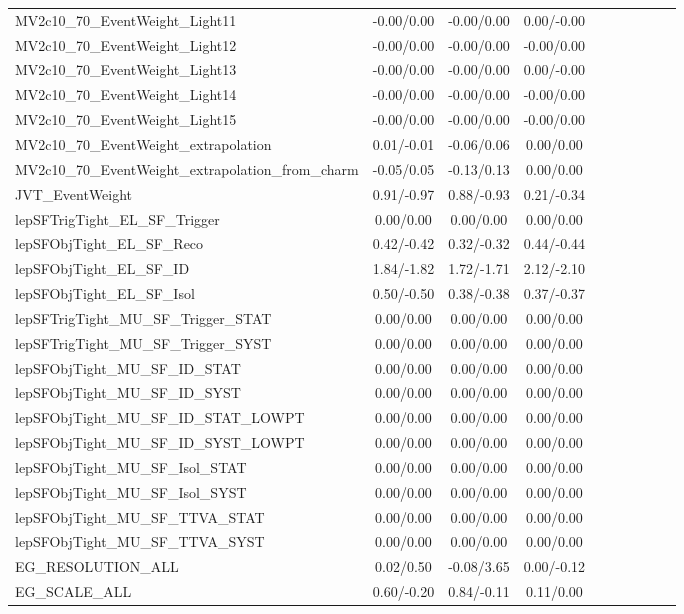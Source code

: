 \begin{table}[h]
\begin{center}
\begin{tabular}{l|ccccccccc}
MV2c10\_70\_EventWeight\_Light11 &-0.00/0.00 &-0.00/0.00 &0.00/-0.00 \\
MV2c10\_70\_EventWeight\_Light12 &-0.00/0.00 &-0.00/0.00 &-0.00/0.00 \\
MV2c10\_70\_EventWeight\_Light13 &-0.00/0.00 &-0.00/0.00 &0.00/-0.00 \\
MV2c10\_70\_EventWeight\_Light14 &-0.00/0.00 &-0.00/0.00 &-0.00/0.00 \\
MV2c10\_70\_EventWeight\_Light15 &-0.00/0.00 &-0.00/0.00 &-0.00/0.00 \\
MV2c10\_70\_EventWeight\_extrapolation &0.01/-0.01 &-0.06/0.06 &0.00/0.00 \\
MV2c10\_70\_EventWeight\_extrapolation\_from\_charm &-0.05/0.05 &-0.13/0.13 &0.00/0.00 \\
JVT\_EventWeight &0.91/-0.97 &0.88/-0.93 &0.21/-0.34 \\
lepSFTrigTight\_EL\_SF\_Trigger &0.00/0.00 &0.00/0.00 &0.00/0.00 \\
lepSFObjTight\_EL\_SF\_Reco &0.42/-0.42 &0.32/-0.32 &0.44/-0.44 \\
lepSFObjTight\_EL\_SF\_ID &1.84/-1.82 &1.72/-1.71 &2.12/-2.10 \\
lepSFObjTight\_EL\_SF\_Isol &0.50/-0.50 &0.38/-0.38 &0.37/-0.37 \\
lepSFTrigTight\_MU\_SF\_Trigger\_STAT &0.00/0.00 &0.00/0.00 &0.00/0.00 \\
lepSFTrigTight\_MU\_SF\_Trigger\_SYST &0.00/0.00 &0.00/0.00 &0.00/0.00 \\
lepSFObjTight\_MU\_SF\_ID\_STAT &0.00/0.00 &0.00/0.00 &0.00/0.00 \\
lepSFObjTight\_MU\_SF\_ID\_SYST &0.00/0.00 &0.00/0.00 &0.00/0.00 \\
lepSFObjTight\_MU\_SF\_ID\_STAT\_LOWPT &0.00/0.00 &0.00/0.00 &0.00/0.00 \\
lepSFObjTight\_MU\_SF\_ID\_SYST\_LOWPT &0.00/0.00 &0.00/0.00 &0.00/0.00 \\
lepSFObjTight\_MU\_SF\_Isol\_STAT &0.00/0.00 &0.00/0.00 &0.00/0.00 \\
lepSFObjTight\_MU\_SF\_Isol\_SYST &0.00/0.00 &0.00/0.00 &0.00/0.00 \\
lepSFObjTight\_MU\_SF\_TTVA\_STAT &0.00/0.00 &0.00/0.00 &0.00/0.00 \\
lepSFObjTight\_MU\_SF\_TTVA\_SYST &0.00/0.00 &0.00/0.00 &0.00/0.00 \\
EG\_RESOLUTION\_ALL &0.02/0.50 &-0.08/3.65 &0.00/-0.12 \\
EG\_SCALE\_ALL &0.60/-0.20 &0.84/-0.11 &0.11/0.00 \\

\end{tabular}
\end{center}
\end{table}
